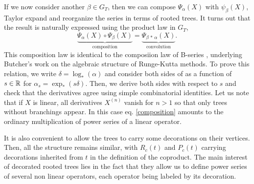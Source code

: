 \documentclass[12pt,here,feynmf]{article}
\begin{document}
If we now consider another $\beta\in G_{T}$, then we can compose $\Psi_{\alpha}(X)$ with $\psi_{\beta}(X)$, Taylor expand and reorganize the series in terms of rooted  trees. It turns out that the result is naturally expressed using the product law in $G_{T}$,
\begin{equation}
\underbrace{\Psi_{\alpha}(X)\circ\Psi_{\beta}(X)}_{\mathrm{composition}}=
\underbrace{\Psi_{\beta\,\ast\,\alpha}(X)}_{\mathrm{convolution}}.
\label{composition}
\end{equation}
This composition law is identical to the composiion law of B-series \cite{wanner},
underlying Butcher's work on the algebraic structure of Runge-Kutta methods. To prove this relation, we write $\delta=\log_{\ast}(\alpha)$ and consider both sides of as a function of $s\in{\Bbb R}$ for $\alpha_{s}=\exp_{\ast}(s\delta)$. Then, we derive both sides with respect to $s$ and check that the derivatives agree using simple combinatorial identities. Let us note  that if $X$ is linear, all derivatives $X^{(n)}$ vanish for $n>1$ so that only trees without branchings appear. In this case eq. \eqref{composition} amounts to the ordinary multiplication of power series of a linear operator. 


It is also convenient to allow the trees to carry some decorations on their vertices. Then, all the structure remains similar, with $R_{c}(t)$ and $P_{c}(t)$ carrying decorations inherited from $t$ in the definition of the coproduct. The main interest of decorated rooted trees lies in the fact that they allow us to define power series of several non linear operators, each operator being labeled by its decoration.
\end{document}
